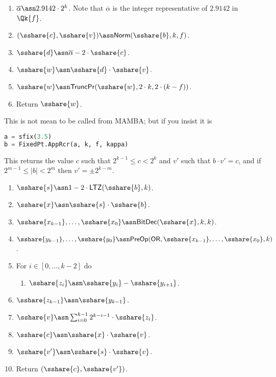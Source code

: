   \begin{enumerate}
    \item $\overline{\alpha} \asn 2.9142 \cdot 2^k$.
          Note that $\overline{\alpha}$ is the integer representative of $2.9142$ in $\Qk{f}$.
    \item $(\sshare{c},\sshare{v}) \asn \mathsf{Norm}(\sshare{b},k,f)$.
    \item $\sshare{d} \asn \overline{\alpha} - 2 \cdot \sshare{c}$.
    \item $\sshare{w} \asn \sshare{d} \cdot \sshare{v}$.
    \item $\sshare{w} \asn \mathsf{TruncPr}(\sshare{w},2 \cdot k,2 \cdot (k-f))$.
    \item Return $\sshare{w}$.
  \end{enumerate}
  This is not mean to be called from MAMBA; but
  if you insist it is
  \begin{lstlisting}[language={python}]
a = sfix(3.5)
b = FixedPt.AppRcr(a, k, f, kappa)
\end{lstlisting}

  This returns the value $c$ such that $2^{k-1} \le c <2^k$
  and $v'$ such that $b \cdot v' = c$,
  and if $2^{m-1} \le |b| <2^m$ then $v'= \pm 2^{k-m}$.
  \begin{enumerate}
    \item $\sshare{s} \asn 1-2 \cdot \mathsf{LTZ}(\sshare{b},k)$.
    \item $\sshare{x} \asn \sshare{s} \cdot \sshare{b}$.
    \item $\sshare{x_{k-1}},\ldots,\sshare{x_0} \asn \mathsf{BitDec}(\sshare{x},k,k)$.
    \item $\sshare{y_{k-1}},\ldots,\sshare{y_0} \asn \mathsf{PreOp}(\mathsf{OR},\sshare{x_{k-1}},\ldots,\sshare{x_0},k)$.
    \item For $i \in [0,\ldots,k-2]$ do
          \begin{enumerate}
            \item $\sshare{z_i} \asn \sshare{y_i}-\sshare{y_{i+1}}$.
          \end{enumerate}
    \item $\sshare{z_{k-1}} \asn \sshare{y_{k-1}}$.
    \item $\sshare{v} \asn \sum_{i=0}^{k-1} 2^{k-i-1} \cdot \sshare{z_i}$.
    \item $\sshare{c} \asn \sshare{x} \cdot \sshare{v}$.
    \item $\sshare{v'} \asn \sshare{s} \cdot \sshare{v}$.
    \item Return $(\sshare{c}, \sshare{v'})$.
  \end{enumerate}

